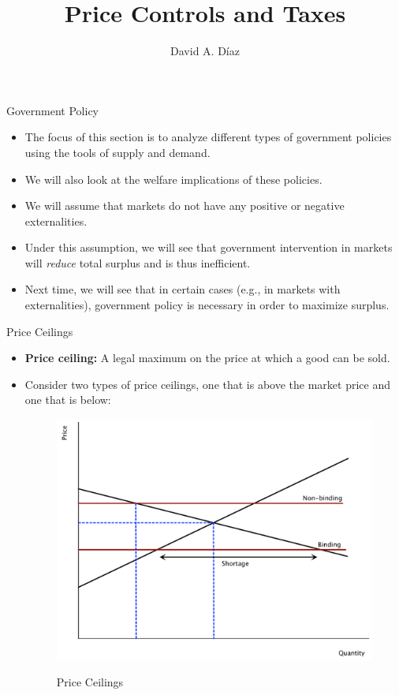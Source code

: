 \documentclass[xcolor={dvipsnames},pdf, hyperref={colorlinks=true, citecolor=ForestGreen, linkcolor=BlueViolet, urlcolor=Magenta}]{beamer}
\title{Price Controls and Taxes}
\author{David A. D\'iaz }
\institute{UNC Chapel Hill}
\date{}
\newcommand{\defn}[1]{\textbf{#1}}
\newcommand{\blank}[0]{}
\newcommand{\ddp}[1]{{\textcolor{ForestGreen}{#1}}}
\begin{document}
 
	
	\begin{frame}
		
		\titlepage
		
	\end{frame}
	
\begin{frame}{Government Policy}
	\begin{itemize}
		\item 	The focus of this section is to analyze different types of government policies using the tools of supply and demand. 
		\item We will also look at the welfare implications of these policies.
		\item We will assume that markets do not have any positive or negative externalities.
		\item Under this assumption, we will see that government intervention in markets will \textit{reduce} total surplus and is thus inefficient.
		\item Next time, we will see that in certain cases (e.g., in markets with externalities), government policy is necessary in order to maximize surplus.
	\end{itemize}

\end{frame}

\begin{frame}{Price  Ceilings}
	\begin{itemize}
		\item 	\defn{Price ceiling:} A legal maximum on the price at which a good can be sold.
		\item Consider two types of price ceilings, one that is above the market price and one that is below:
		\blank\blank\blank\blank
		\begin{figure}[H]
			\centering
			\ddp{\includegraphics[scale=.30]{plot34.pdf}}
			\caption{Price Ceilings}
		\end{figure}
	\end{itemize}
\end{frame}
\end{document}
